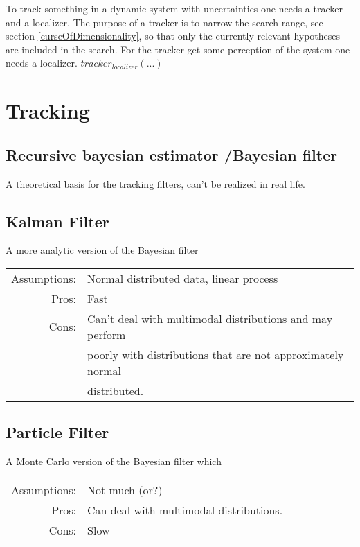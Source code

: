 
To track something in a dynamic system with uncertainties one needs a tracker and a localizer. The purpose of a tracker is to narrow the search range, see section \ref{curseOfDimensionality}, so that only the currently relevant hypotheses are included in the search. For the tracker get some perception of the system one needs a localizer. $tracker_{localizer}(...)$


\section{Tracking}
\subsection*{Recursive bayesian estimator /Bayesian filter}
A theoretical basis for the tracking filters, can't be realized in real life.
\subsection{Kalman Filter}
A more analytic version of the Bayesian filter

\begin{tabular}[h]{rl}
Assumptions: & Normal distributed data, linear process\\ %
Pros: & Fast\\
Cons: & Can't deal with multimodal distributions and may perform\\
& poorly with distributions that are not approximately normal\\
& distributed.
\end{tabular}

\subsection*{Particle Filter}
A Monte Carlo version of the Bayesian filter which 

\begin{tabular}[h]{rl}
  Assumptions: & Not much (or?)\\
  Pros: & Can deal with multimodal distributions.\\
  Cons: & Slow
\end{tabular}

